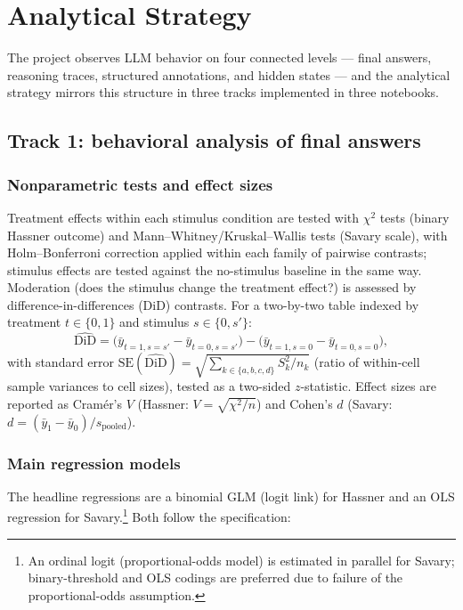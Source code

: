 \documentclass[14pt,a4paper]{extarticle}
\begin{document}
\section{Analytical Strategy}

The project observes LLM behavior on four connected levels --- final answers, reasoning traces, structured annotations, and hidden states --- and the analytical strategy mirrors this structure in three tracks implemented in three notebooks.

\subsection{Track 1: behavioral analysis of final answers}

\subsubsection*{Nonparametric tests and effect sizes}

Treatment effects within each stimulus condition are tested with $\chi^2$ tests (binary Hassner outcome) and Mann--Whitney/Kruskal--Wallis tests (Savary scale), with Holm--Bonferroni correction applied within each family of pairwise contrasts; stimulus effects are tested against the no-stimulus baseline in the same way. Moderation (does the stimulus change the treatment effect?) is assessed by difference-in-differences (DiD) contrasts. For a two-by-two table indexed by treatment $t \in \{0,1\}$ and stimulus $s \in \{0,s'\}$:
\begin{equation}
\widehat{\mathrm{DiD}} = \bigl(\bar{y}_{t=1,s=s'} - \bar{y}_{t=0,s=s'}\bigr) - \bigl(\bar{y}_{t=1,s=0} - \bar{y}_{t=0,s=0}\bigr),
\label{eq:did}
\end{equation}
with standard error $\mathrm{SE}(\widehat{\mathrm{DiD}}) = \sqrt{\sum_{k \in \{a,b,c,d\}} S_k^2 / n_k}$ (ratio of within-cell sample variances to cell sizes), tested as a two-sided $z$-statistic. Effect sizes are reported as Cram\'er's $V$ (Hassner: $V = \sqrt{\chi^2 / n}$) and Cohen's $d$ (Savary: $d = (\bar{y}_1 - \bar{y}_0)/s_{\mathrm{pooled}}$).

\subsubsection*{Main regression models}

The headline regressions are a binomial GLM (logit link) for Hassner and an OLS regression for Savary.\footnote{An ordinal logit (proportional-odds model) is estimated in parallel for Savary; binary-threshold and OLS codings are preferred due to failure of the proportional-odds assumption.} Both follow the specification:
\end{document}
